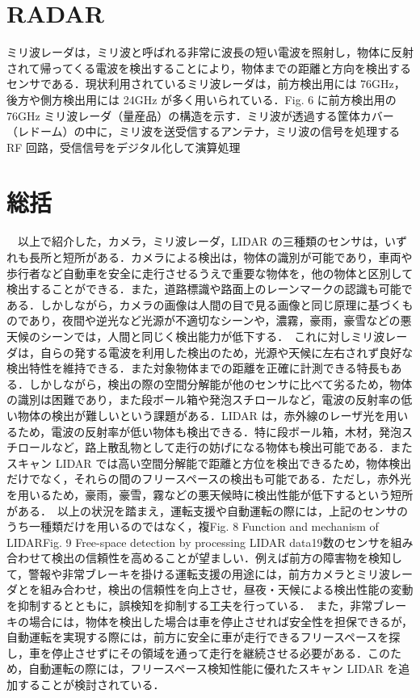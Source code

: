 \section{RADAR}
ミリ波レーダは，ミリ波と呼ばれる非常に波長の短い電波を照射し，物体に反射されて帰ってくる電波を検出することにより，物体までの距離と方向を検出するセンサである．現状利用されているミリ波レーダは，前方検出用には 76GHz，後方や側方検出用には 24GHz が多く用いられている．Fig. 6 に前方検出用の 76GHz ミリ波レーダ（量産品）の構造を示す．ミリ波が透過する筐体カバー（レドーム）の中に，ミリ波を送受信するアンテナ，ミリ波の信号を処理する RF 回路，受信信号をデジタル化して演算処理

\section{総括}
　以上で紹介した，カメラ，ミリ波レーダ，LIDAR の三種類のセンサは，いずれも長所と短所がある．カメラによる検出は，物体の識別が可能であり，車両や歩行者など自動車を安全に走行させるうえで重要な物体を，他の物体と区別して検出することができる．また，道路標識や路面上のレーンマークの認識も可能である．しかしながら，カメラの画像は人間の目で見る画像と同じ原理に基づくものであり，夜間や逆光など光源が不適切なシーンや，濃霧，豪雨，豪雪などの悪天候のシーンでは，人間と同じく検出能力が低下する．　これに対しミリ波レーダは，自らの発する電波を利用した検出のため，光源や天候に左右されず良好な検出特性を維持できる．また対象物体までの距離を正確に計測できる特長もある．しかしながら，検出の際の空間分解能が他のセンサに比べて劣るため，物体の識別は困難であり，また段ボール箱や発泡スチロールなど，電波の反射率の低い物体の検出が難しいという課題がある．LIDAR は，赤外線のレーザ光を用いるため，電波の反射率が低い物体も検出できる．特に段ボール箱，木材，発泡スチロールなど，路上散乱物として走行の妨げになる物体も検出可能である．またスキャン LIDAR では高い空間分解能で距離と方位を検出できるため，物体検出だけでなく，それらの間のフリースペースの検出も可能である．ただし，赤外光を用いるため，豪雨，豪雪，霧などの悪天候時に検出性能が低下するという短所がある．　以上の状況を踏まえ，運転支援や自動運転の際には，上記のセンサのうち一種類だけを用いるのではなく，複Fig. 8 Function and mechanism of LIDARFig. 9 Free-space detection by processing LIDAR data19数のセンサを組み合わせて検出の信頼性を高めることが望ましい．例えば前方の障害物を検知して，警報や非常ブレーキを掛ける運転支援の用途には，前方カメラとミリ波レーダとを組み合わせ，検出の信頼性を向上させ，昼夜・天候による検出性能の変動を抑制するとともに，誤検知を抑制する工夫を行っている．　また，非常ブレーキの場合には，物体を検出した場合は車を停止させれば安全性を担保できるが，自動運転を実現する際には，前方に安全に車が走行できるフリースペースを探し，車を停止させずにその領域を通って走行を継続させる必要がある．このため，自動運転の際には，フリースペース検知性能に優れたスキャン LIDAR を追加することが検討されている．

